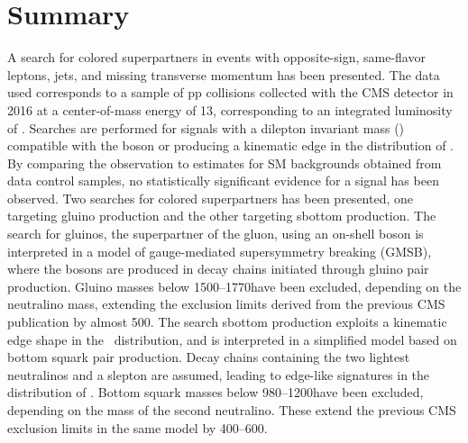 \section{Summary}
\noindent
\justify
A search for colored superpartners in events with opposite-sign, same-flavor leptons, jets, and missing transverse momentum has been presented. 
The data used corresponds to a sample of pp collisions collected with the CMS detector in 2016 at a center-of-mass energy of 13\TeV, corresponding to an integrated luminosity of \lint.
Searches are performed for signals with a dilepton invariant mass (\mll) compatible with the \PZ boson or producing a kinematic edge in the distribution of \mll.
By comparing the observation to estimates for SM backgrounds obtained from data control samples, no statistically significant evidence for a signal has been observed.
Two searches for colored superpartners has been presented, one targeting gluino production and the other targeting sbottom production. 
The search for gluinos, the superpartner of the gluon, using an on-shell \PZ boson is interpreted in a model of gauge-mediated supersymmetry breaking (GMSB), where the \PZ bosons are produced in decay chains initiated through gluino pair production.
Gluino masses below 1500--1770\GeV have been excluded, depending on the neutralino mass, extending the exclusion limits derived from the previous CMS publication by almost 500\GeV.
The search sbottom production exploits a kinematic edge shape in the \mll\ distribution, and is interpreted in a simplified model based on bottom squark pair production.
Decay chains containing the two lightest neutralinos and a slepton are assumed, leading to edge-like signatures in the distribution of \mll.
Bottom squark masses below 980--1200\GeV have been excluded, depending on the mass of the second neutralino.
These extend the previous CMS exclusion limits in the same model by 400--600\GeV.
